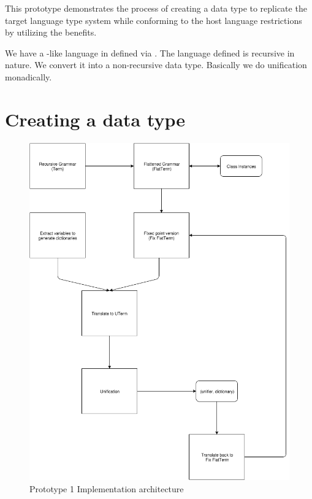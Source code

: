 \documentclass[thesis-solanki.tex]{subfiles}
\begin{document}
This prototype demonstrates the process of creating a data type to replicate the target language type system while conforming to the host 
language restrictions by utilizing the
benefits.



We have a -like language in  defined via . The language defined is recursive in nature. We convert 
it into a non-recursive data type. Basically we do unification monadically.

\section{Creating a data type}
\begin{figure}[H]
  \includegraphics[width=1\textwidth]{prototype_1_implementation_architecture.png}
  \caption{Prototype 1 Implementation architecture}
  \label{fig:proto1-impl-arch}
\end{figure}
\end{document}
